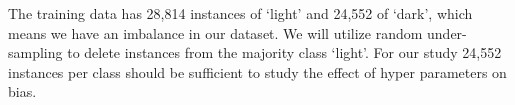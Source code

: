 \documentclass[conference]{IEEEtran}
\begin{document}
The training data has 28,814 instances of ‘light’ and 24,552 of ‘dark’, which means we have an imbalance in our dataset. We will utilize random under-sampling to delete instances from the majority class ‘light’. For our study 24,552 instances per class should be sufficient to study the effect of hyper parameters on bias.

\end{document}
